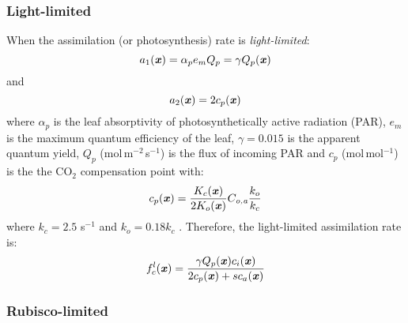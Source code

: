 \subsubsection*{Light-limited}
When the assimilation (or photosynthesis) rate is \textit{light-limited}:
\begin{equation}
a_1(\textbf{\textit{x}}) = \alpha_p e_m Q_p = \gamma Q_p(\textbf{\textit{x}})
\end{equation}
and 
\begin{equation}
a_2(\textbf{\textit{x}}) = 2c_p(\textbf{\textit{x}})
\end{equation}
where $\alpha_p$ is the leaf absorptivity of photosynthetically active radiation (PAR), $e_m$ is the maximum quantum efficiency of the leaf, $\gamma = 0.015$ is the apparent quantum yield, $Q_p$ (mol\,m$^{-2}$\,s$^{-1}$) is the flux of incoming PAR and $c_p$ (mol\,mol$^{-1}$) is the the CO$_2$ compensation point with:
\begin{equation}
c_p(\textbf{\textit{x}}) = \frac{K_c(\textbf{\textit{x}})}{2 K_o(\textbf{\textit{x}})} C_{\textit{o,a}} \frac{k_o}{k_c}
\end{equation}
where $k_c = 2.5$ s$^{-1}$ and  $k_o = 0.18 k_c$ \citep{Farquhar1980}. Therefore, the light-limited assimilation rate is:
\begin{equation}
f_c^l (\textbf{\textit{x}}) = \frac{\gamma Q_p(\textbf{\textit{x}})  c_i(\textbf{\textit{x}}) }{2c_p(\textbf{\textit{x}}) + s c_a(\textbf{\textit{x}})}
\end{equation}

\subsubsection*{Rubisco-limited}

